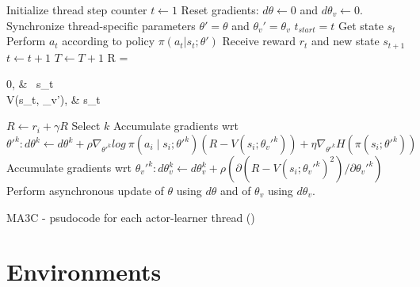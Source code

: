 \begin{algorithm}[hbtp]
\begin{algorithmic}
    \State {}
    \State {}
    \State {}
    \State Initialize thread step counter $t \leftarrow 1$
    \Repeat
        \State Reset gradients: $d\theta \leftarrow 0$ and $d\theta_v \leftarrow 0$.
        \State Synchronize thread-specific parameters $\theta' = \theta$ and $\theta_v' = \theta_v$
        \State $t_{start} = t$
        \State Get state $s_t$
        \Repeat
            \State Perform $a_t$ according to policy $\pi(a_t|s_t;\theta')$
            \State Receive reward $r_t$ and new state $s_{t+1}$
            \State $t \leftarrow t + 1$
            \State $T \leftarrow T + 1$
        \State R = \begin{cases}
                0,   & \ s_t \\
                V(s_t, \theta_v'),   &  s_t \;\\
            \end{cases}
            \State $R \leftarrow r_i + \gamma R$
            \State Select $k$ \;
            \State Accumulate gradients wrt $\theta'^k: d\theta^k \leftarrow d\theta^k + \rho\nabla_{\theta'^k} log\:\pi(a_i\mid s_i;\theta'^k)(R-V(s_i;\theta_v'^k))+\eta\nabla_{\theta'^k}H(\pi(s_i;\theta'^k))$
            \State Accumulate gradients wrt $\theta_v'^k: d\theta_v^k \leftarrow d\theta_v^k + \rho(\partial(R-V(s_i;\theta_v'^k)^{2}) / \partial \theta_{v}'^k)$
        \EndFor
        \State Perform asynchronous update of $\theta$ using $d\theta$ and of $\theta_v$ using $d\theta_v$.
\end{algorithmic}
\caption{\acl{MA3C} - psudocode for each actor-learner thread (\cite{mnih2016A3C})}
\label{alg:MA3C}
\end{algorithm}

\section{Environments}

